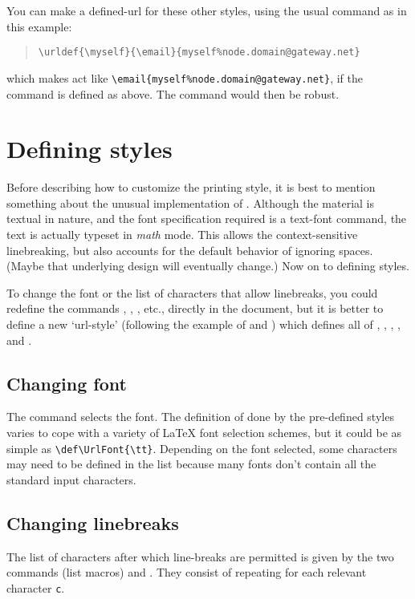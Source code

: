 \documentclass[a4paper,11pt]{article}
\begin{document}
You can make a defined-url for these other styles, using the usual
 command as in this example:
\begin{quote}
\verb+\urldef{\myself}{\email}{myself%node.domain@gateway.net}+
\end{quote}
which makes  act like
\verb+\email{myself%node.domain@gateway.net}+,
if the  command is defined as above.  The 
command would then be robust.

\section{Defining styles}

Before describing how to customize the printing style, it is best to
mention something about the unusual implementation of .  Although
the material is textual in nature, and the font specification required
is a text-font command, the text is actually typeset in \emph{math} mode.
This allows the context-sensitive linebreaking, but also accounts for
the default behavior of ignoring spaces.  (Maybe that underlying design 
will eventually change.) Now on to defining styles.

To change the font or the list of characters that allow linebreaks, you
could redefine the commands , ,
, etc., directly in the document, but it is better to
define a new `url-style' (following the example of 
and ) which defines all of ,
, , , and .

\subsection{Changing font}
The  command selects the font.  The definition of
 done by the pre-defined styles varies to cope with a
variety of \LaTeX{} font selection schemes, but it could be as simple
as \verb+\def\UrlFont{\tt}+.  Depending on the font selected, some
characters may need to be defined in the  list because
many fonts don't contain all the standard input characters.

\subsection{Changing linebreaks}
The list of characters after which line-breaks are permitted is 
given by the two commands (list macros)
 and . They consist of repeating
 for each relevant character \texttt{c}.
\end{document}

